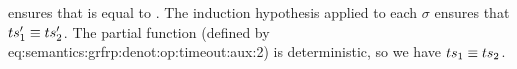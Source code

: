 \begin{skippableproof}
     ensures that  is equal to \depSet{\sigma}.
    The induction hypothesis applied to each $\sigma$ ensures that $ts'_1 \equiv ts'_2$. The partial
    function  (defined by 
    {eq:semantics:grfrp:denot:op:timeout:aux:2}) is deterministic, so we have $ts_1 \equiv ts_2$.

    \setcounter{paragraph}{0}
\end{skippableproof}

\newcommand{\declSet}[1]{{\ensuremath{\textit{decl}\left(#1\right)}}}
\newcommand{\importSet}[1]{{\ensuremath{\textit{import}\left(#1\right)}}}
\newcommand{\exportSet}[1]{{\ensuremath{\textit{export}\left(#1\right)}}}
\begin{definition}
    \label{not:semantics:grfrp:theorems:determinism:sets}


\end{definition}
